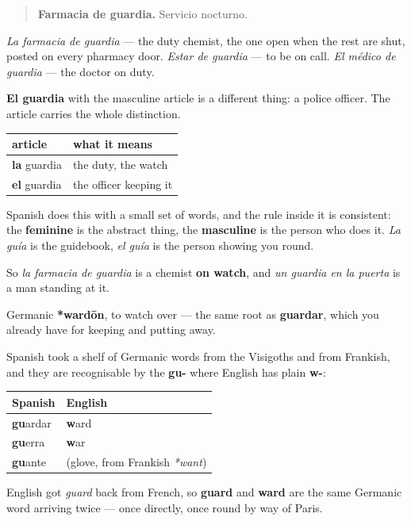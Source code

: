 \begin{quote}
\textbf{Farmacia de guardia.} Servicio nocturno.
\end{quote}

\emph{La farmacia de guardia} — the duty chemist, the one open when the rest are shut, posted on every pharmacy door. \emph{Estar de guardia} — to be on call. \emph{El médico de guardia} — the doctor on duty.

\textbf{El guardia} with the masculine article is a different thing: a police officer. The article carries the whole distinction.

\begin{grammarlens}[title={Grammar Lens: one word, two genders, two meanings}]
\noindent
\begin{tabularx}{\linewidth}{@{}>{\raggedright\arraybackslash}X>{\raggedright\arraybackslash}X@{}}
\toprule
\textbf{article} & \textbf{what it means} \\
\midrule
\textbf{la} guardia & the duty, the watch \\
\textbf{el} guardia & the officer keeping it \\
\bottomrule
\end{tabularx}

Spanish does this with a small set of words, and the rule inside it is consistent: the \textbf{feminine} is the abstract thing, the \textbf{masculine} is the person who does it. \emph{La guía} is the guidebook, \emph{el guía} is the person showing you round.

So \emph{la farmacia de guardia} is a chemist \textbf{on watch}, and \emph{un guardia en la puerta} is a man standing at it.
\end{grammarlens}

\begin{cousinweb}
Germanic \textbf{*wardōn}, to watch over — the same root as \textbf{guardar}, which you already have for keeping and putting away.

Spanish took a shelf of Germanic words from the Visigoths and from Frankish, and they are recognisable by the \textbf{gu-} where English has plain \textbf{w-}:

\noindent
\begin{tabularx}{\linewidth}{@{}>{\raggedright\arraybackslash}X>{\raggedright\arraybackslash}X@{}}
\toprule
\textbf{Spanish} & \textbf{English} \\
\midrule
\textbf{gu}ardar & \textbf{w}ard \\
\textbf{gu}erra & \textbf{w}ar \\
\textbf{gu}ante & (glove, from Frankish \emph{*want}) \\
\bottomrule
\end{tabularx}

English got \emph{guard} back from French, so \textbf{guard} and \textbf{ward} are the same Germanic word arriving twice — once directly, once round by way of Paris.
\end{cousinweb}

